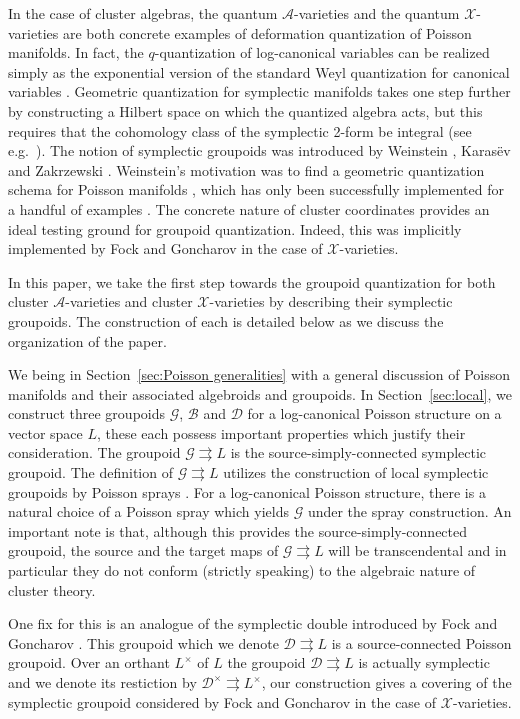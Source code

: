 \documentclass{amsart}
\numberwithin{equation}{section}
\newcommand{\cA}{\mathcal{A}}
\newcommand{\cB}{\mathcal{B}}
\newcommand{\cD}{\mathcal{D}}
\newcommand{\cG}{\mathcal{G}}
\newcommand{\cX}{\mathcal{X}}
\newcommand{\rra}{\rightrightarrows}
\begin{document}
In the case of cluster algebras, the quantum $\cA$-varieties \cite{BZ05} and the quantum $\cX$-varieties \cite{FG09a} are both concrete examples of deformation quantization of Poisson manifolds.
In fact, the $q$-quantization of log-canonical variables can be realized simply as the exponential version of the standard Weyl quantization for canonical variables \cite{FG09c}.
Geometric quantization for symplectic manifolds takes one step further by constructing a Hilbert space on which the quantized algebra acts, but this requires that the cohomology class of the symplectic 2-form be integral (see e.g.\ \cite{BW97}).
The notion of symplectic groupoids was introduced by Weinstein \cite{Wei87}, Karas\"{e}v \cite{Kar89} and Zakrzewski \cite{Zak90a, Zak90b}.
Weinstein's motivation was to find a geometric quantization schema for Poisson manifolds \cite{Wei91}, which has only been successfully implemented for a handful of examples \cite{Tan06, Haw08, BCST12}.
The concrete nature of cluster coordinates provides an ideal testing ground for groupoid quantization.
Indeed, this was implicitly implemented by Fock and Goncharov \cite{FG09c} in the case of $\cX$-varieties.

In this paper, we take the first step towards the groupoid quantization for both cluster $\cA$-varieties and cluster $\cX$-varieties by describing their symplectic groupoids.
The construction of each is detailed below as we discuss the organization of the paper.

We being in Section~\ref{sec:Poisson generalities} with a general discussion of Poisson manifolds and their associated algebroids and groupoids.
In Section~\ref{sec:local}, we construct three groupoids $\cG$, $\cB$ and $\cD$ for a log-canonical Poisson structure on a vector space $L$, these each possess important properties which justify their consideration.
The groupoid $\cG \rra L$ is the source-simply-connected symplectic groupoid.
The definition of $\cG \rra L$ utilizes the construction of local symplectic groupoids by Poisson sprays \cite{CM11, CMS17}.
For a log-canonical Poisson structure, there is a natural choice of a Poisson spray which yields $\cG$ under the spray construction.
An important note is that, although this provides the source-simply-connected groupoid, the source and the target maps of $\cG \rra L$ will be transcendental and in particular they do not conform (strictly speaking) to the algebraic nature of cluster theory.

One fix for this is an analogue of the symplectic double introduced by Fock and Goncharov \cite{FG09c}.
This groupoid which we denote $\cD \rra L$ is a source-connected Poisson groupoid.
Over an orthant $L^\times$ of $L$ the groupoid $\cD \rra L$ is actually symplectic and we denote its restiction by $\cD^\times \rra L^\times$, our construction gives a covering of the symplectic groupoid considered by Fock and Goncharov in the case of $\cX$-varieties.
\end{document}
